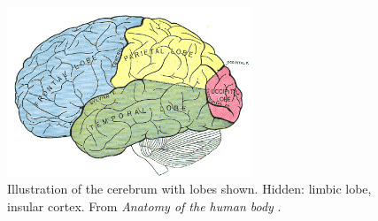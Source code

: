 \begin{figure}
	\centering
	\includegraphics[width=0.65\textwidth]{Figs/brain.png}
	\caption{Illustration of the cerebrum with lobes shown. Hidden: limbic lobe, insular cortex. From {\em Anatomy of the human body} \cite[Fig. 728]{graysAnatomy}.}
	\label{fig:brain}
\end{figure}

